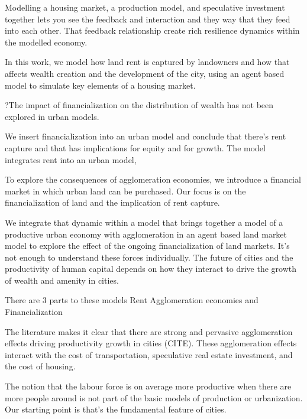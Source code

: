 Modelling a housing market, a production model, and speculative investment together lets you see the feedback and interaction and they way that they feed into each other. That feedback relationship create rich resilience dynamics within the modelled economy. 

In this work, we model how land rent is captured by landowners and how that affects wealth creation and the development of the city, using an agent based model to simulate key elements of a housing market. 

?The impact of financialization on the distribution of wealth has not been explored in urban models.

We insert financialization into an urban model and conclude that there's rent capture and that has implications for equity and for growth. 
The model integrates rent into an urban model, 

To explore the consequences of agglomeration economies, we introduce a financial market in which urban land can be purchased. 
Our focus is on the financialization of land and the implication of rent capture.


We integrate that dynamic within a model that brings together a model of a productive urban economy with agglomeration in an agent based land market model to explore the effect of %
the ongoing financialization of land markets. 
It's not enough to understand these forces individually.
The future of cities and the productivity of human capital depends on how they interact to drive the growth of wealth and amenity in cities. 

There are 3 parts to these models
Rent
Agglomeration economies and 
Financialization




The literature makes it clear that there are strong and  pervasive agglomeration effects driving productivity growth in cities (CITE). %
These agglomeration effects interact with the cost of transportation, speculative real estate investment, and the cost of housing. 

The notion that the labour force is on average more productive when there are more people around is %
not part of the basic models of production or urbanization. Our starting point is that's the fundamental feature of cities. 


